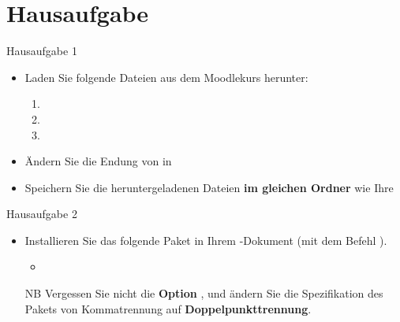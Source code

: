 
\section{Hausaufgabe}
%
\begin{frame}{Hausaufgabe 1}

\begin{itemize}
	
	\item Laden Sie folgende Dateien aus dem Moodlekurs herunter:
	
	\begin{enumerate}
		\item {}
		\item {}
		\item {}
	\end{enumerate}
	
	\item Ändern Sie die Endung von  in 
	
	\item Speichern Sie die heruntergeladenen Dateien \textbf{im gleichen Ordner} wie Ihre 

	
\end{itemize}

\end{frame}


\begin{frame}[fragile]{Hausaufgabe 2}

\begin{itemize}
	
	\item Installieren Sie das folgende Paket in Ihrem -Dokument (mit dem Befehl ).
	
	\begin{itemize}
		\item {}
	\end{itemize}
	
	\item[NB] Vergessen Sie nicht die \textbf{Option }, und ändern Sie die Spezifikation des Pakets von Kommatrennung auf \textbf{Doppelpunkttrennung}.

%		
%		
\end{itemize}

\end{frame}


